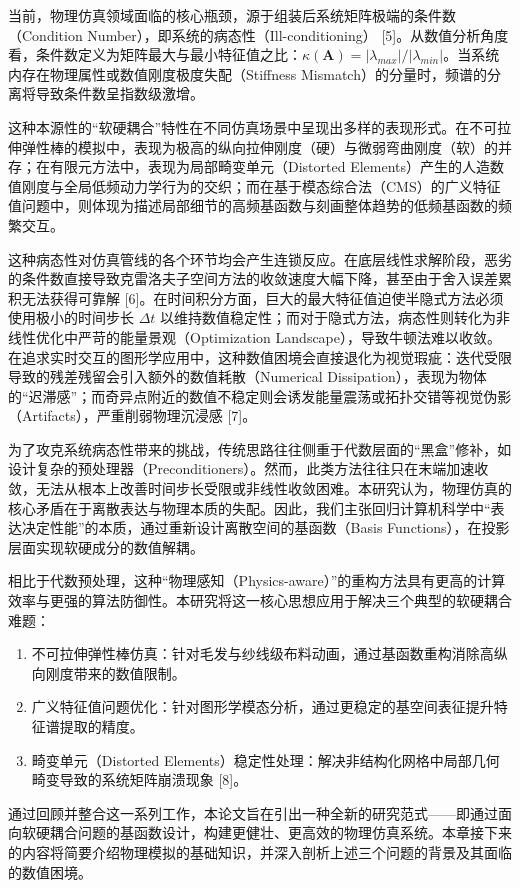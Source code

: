 当前，物理仿真领域面临的核心瓶颈，源于组装后系统矩阵极端的条件数（Condition Number），即系统的病态性（Ill-conditioning） [5]。从数值分析角度看，条件数定义为矩阵最大与最小特征值之比：$\kappa(\mathbf{A}) = |\lambda_{max}| / |\lambda_{min}|$。当系统内存在物理属性或数值刚度极度失配（Stiffness Mismatch）的分量时，频谱的分离将导致条件数呈指数级激增。

这种本源性的“软硬耦合”特性在不同仿真场景中呈现出多样的表现形式。在不可拉伸弹性棒的模拟中，表现为极高的纵向拉伸刚度（硬）与微弱弯曲刚度（软）的并存；在有限元方法中，表现为局部畸变单元（Distorted Elements）产生的人造数值刚度与全局低频动力学行为的交织；而在基于模态综合法（CMS）的广义特征值问题中，则体现为描述局部细节的高频基函数与刻画整体趋势的低频基函数的频繁交互。

这种病态性对仿真管线的各个环节均会产生连锁反应。在底层线性求解阶段，恶劣的条件数直接导致克雷洛夫子空间方法的收敛速度大幅下降，甚至由于舍入误差累积无法获得可靠解 [6]。在时间积分方面，巨大的最大特征值迫使半隐式方法必须使用极小的时间步长 $\Delta t$ 以维持数值稳定性；而对于隐式方法，病态性则转化为非线性优化中严苛的能量景观（Optimization Landscape），导致牛顿法难以收敛。在追求实时交互的图形学应用中，这种数值困境会直接退化为视觉瑕疵：迭代受限导致的残差残留会引入额外的数值耗散（Numerical Dissipation），表现为物体的“迟滞感”；而奇异点附近的数值不稳定则会诱发能量震荡或拓扑交错等视觉伪影（Artifacts），严重削弱物理沉浸感 [7]。

为了攻克系统病态性带来的挑战，传统思路往往侧重于代数层面的“黑盒”修补，如设计复杂的预处理器（Preconditioners）。然而，此类方法往往只在末端加速收敛，无法从根本上改善时间步长受限或非线性收敛困难。本研究认为，物理仿真的核心矛盾在于离散表达与物理本质的失配。因此，我们主张回归计算机科学中“表达决定性能”的本质，通过重新设计离散空间的基函数（Basis Functions），在投影层面实现软硬成分的数值解耦。

相比于代数预处理，这种“物理感知（Physics-aware）”的重构方法具有更高的计算效率与更强的算法防御性。本研究将这一核心思想应用于解决三个典型的软硬耦合难题：
\begin{enumerate}
    \item 不可拉伸弹性棒仿真：针对毛发与纱线级布料动画，通过基函数重构消除高纵向刚度带来的数值限制。
    \item 广义特征值问题优化：针对图形学模态分析，通过更稳定的基空间表征提升特征谱提取的精度。
    \item 畸变单元（Distorted Elements）稳定性处理：解决非结构化网格中局部几何畸变导致的系统矩阵崩溃现象 [8]。
\end{enumerate}

通过回顾并整合这一系列工作，本论文旨在引出一种全新的研究范式——即通过面向软硬耦合问题的基函数设计，构建更健壮、更高效的物理仿真系统。本章接下来的内容将简要介绍物理模拟的基础知识，并深入剖析上述三个问题的背景及其面临的数值困境。